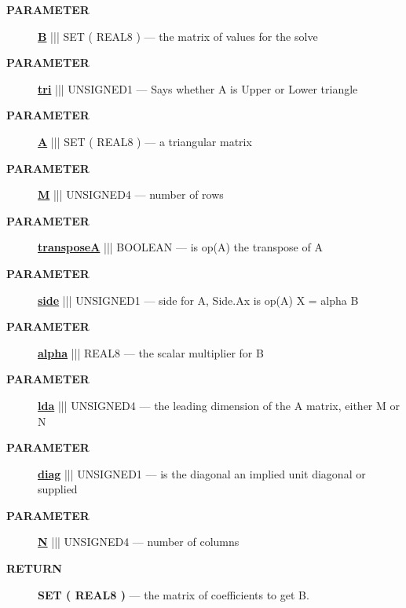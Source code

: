 \par
\begin{description}
\item [\colorbox{tagtype}{\color{white} \textbf{\textsf{PARAMETER}}}] \textbf{\underline{B}} ||| SET ( REAL8 ) --- the matrix of values for the solve
\item [\colorbox{tagtype}{\color{white} \textbf{\textsf{PARAMETER}}}] \textbf{\underline{tri}} ||| UNSIGNED1 --- Says whether A is Upper or Lower triangle
\item [\colorbox{tagtype}{\color{white} \textbf{\textsf{PARAMETER}}}] \textbf{\underline{A}} ||| SET ( REAL8 ) --- a triangular matrix
\item [\colorbox{tagtype}{\color{white} \textbf{\textsf{PARAMETER}}}] \textbf{\underline{M}} ||| UNSIGNED4 --- number of rows
\item [\colorbox{tagtype}{\color{white} \textbf{\textsf{PARAMETER}}}] \textbf{\underline{transposeA}} ||| BOOLEAN --- is op(A) the transpose of A
\item [\colorbox{tagtype}{\color{white} \textbf{\textsf{PARAMETER}}}] \textbf{\underline{side}} ||| UNSIGNED1 --- side for A, Side.Ax is op(A) X = alpha B
\item [\colorbox{tagtype}{\color{white} \textbf{\textsf{PARAMETER}}}] \textbf{\underline{alpha}} ||| REAL8 --- the scalar multiplier for B
\item [\colorbox{tagtype}{\color{white} \textbf{\textsf{PARAMETER}}}] \textbf{\underline{lda}} ||| UNSIGNED4 --- the leading dimension of the A matrix, either M or N
\item [\colorbox{tagtype}{\color{white} \textbf{\textsf{PARAMETER}}}] \textbf{\underline{diag}} ||| UNSIGNED1 --- is the diagonal an implied unit diagonal or supplied
\item [\colorbox{tagtype}{\color{white} \textbf{\textsf{PARAMETER}}}] \textbf{\underline{N}} ||| UNSIGNED4 --- number of columns
\end{description}







\par
\begin{description}
\item [\colorbox{tagtype}{\color{white} \textbf{\textsf{RETURN}}}] \textbf{SET ( REAL8 )} --- the matrix of coefficients to get B.
\end{description}




